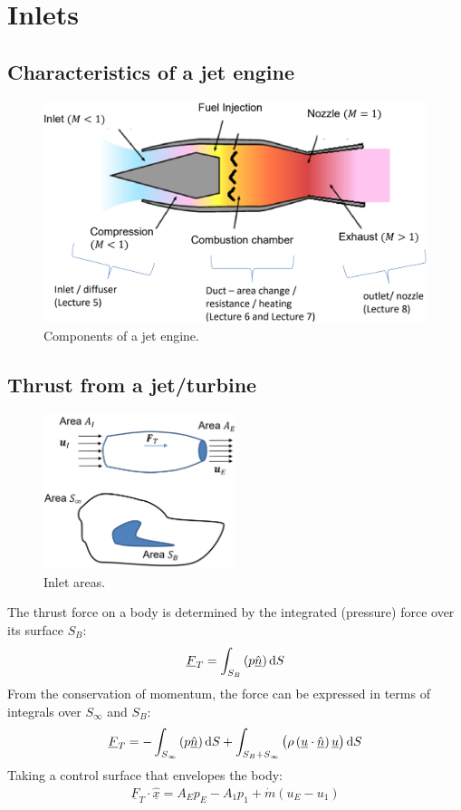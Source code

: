 \documentclass[class=report, crop=false, 12pt,a4paper]{standalone}
\begin{document}
\section{Inlets}
\subsection{Characteristics of a jet engine}
\begin{figure}[H]
    \centering
    \includegraphics[width = \textwidth]{../img/diagram37.png}
    \caption{Components of a jet engine.}
\end{figure}
\subsection{Thrust from a jet/turbine}
\begin{figure}[H]
    \centering
    \includegraphics[width = 0.5\textwidth]{../img/diagram38.png}
    \caption{Inlet areas.}
\end{figure}
The thrust force on a body is determined by the integrated (pressure) force over its surface $S_B$:
\begin{gather}
    \underline{F}_T = \int_{S_{B}}\left(p\underline{\hat{n}}\right)\dif S
\end{gather}
From the conservation of momentum, the force can be expressed in terms of integrals over $S_{\infty}$ and $S_B$:
\begin{gather}
    \underline{F}_T = - \int_{S_{\infty}}\left(p \underline{\hat{n}}\right)\dif S + \int_{S_B + S_{\infty}}\left(\rho\left(\underline{u}\cdot\underline{\hat{n}}\right)\underline{u}\right)\dif S
\end{gather}
Taking a control surface that envelopes the body:
\begin{gather}
    \underline{F}_T \cdot \underline{\hat{x}} = A_Ep_E - A_1 p_1 + \dot{m} \left(u_E - u_1\right)
\end{gather}
\end{document}
